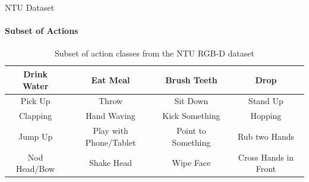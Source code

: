 \documentclass[aspectratio=169]{beamer}
\begin{document}
\begin{frame}{NTU Dataset}
      \framesubtitle{Subset of Actions}%
      
      \begin{table}[ht!]
      \centering
      \begin{tabular}{ |c|c|c|c| } 
              \hline
              Drink Water & Eat Meal & Brush Teeth & Drop \\ 
              \hline
              Pick Up & Throw & Sit Down & Stand Up \\ 
              \hline
              Clapping & Hand Waving & Kick Something & Hopping \\ 
              \hline
              Jump Up & Play with Phone/Tablet & Point to Something & Rub two Hands \\
              \hline
              Nod Head/Bow & Shake Head & Wipe Face & Cross Hands in Front \\
              \hline
      \end{tabular}
      \caption{Subset of action classes from the NTU RGB-D dataset}
      \end{table}
\end{frame}
\end{document}
